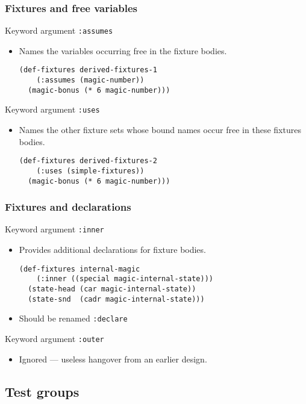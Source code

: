 \documentclass{beamer}
\begin{document}
\begin{frame}[fragile]
  \frametitle{Fixtures and free variables}
Keyword argument \texttt{:assumes}
\begin{itemize}
\item Names the variables occurring free in the fixture bodies.
\begin{verbatim}
(def-fixtures derived-fixtures-1
    (:assumes (magic-number))
  (magic-bonus (* 6 magic-number)))
\end{verbatim}
\end{itemize}
Keyword argument \texttt{:uses}
\begin{itemize}
\item Names the other fixture sets whose bound names occur free in
  these fixtures bodies.
\begin{verbatim}
(def-fixtures derived-fixtures-2
    (:uses (simple-fixtures))
  (magic-bonus (* 6 magic-number)))
\end{verbatim}
\end{itemize}
\end{frame}

\begin{frame}[fragile]
  \frametitle{Fixtures and declarations}
Keyword argument \texttt{:inner}
\begin{itemize}
\item Provides additional declarations for fixture bodies.
\begin{verbatim}
(def-fixtures internal-magic
    (:inner ((special magic-internal-state)))
  (state-head (car magic-internal-state))
  (state-snd  (cadr magic-internal-state)))
\end{verbatim}
\item Should be renamed \texttt{:declare}
\end{itemize}
Keyword argument \texttt{:outer}
\begin{itemize}
\item Ignored --- useless hangover from an earlier design.
\end{itemize}
  
\end{frame}

\subsection{Test groups}
\end{document}
